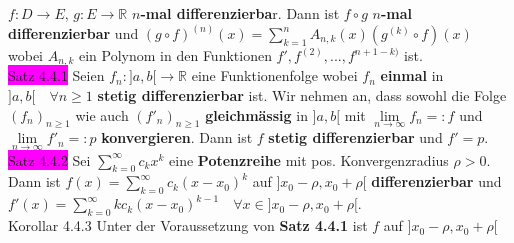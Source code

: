 \documentclass[landscape, 10pt]{article}
\newcommand{\R}{\mathbb{R}}
\begin{document}
\begin{multicols}{3}
                     \textcolor{NavyBlue}{$f:D\longrightarrow E$},
                     \textcolor{NavyBlue}{$g:E\longrightarrow\R$} 
                     \textbf{$n$-mal differenzierba}r.
                     Dann ist \textcolor{NavyBlue}{$f\circ g$} 
                     $n$\textbf{-mal differenzierbar} und 
                     \textcolor{NavyBlue}{
                     $(g\circ f)^{(n)}(x)
                     =\sum_{k=1}^nA_{n,k}(x)(g^{(k)}\circ f)(x)$}
                     wobei \textcolor{NavyBlue}{$A_{n,k}$} 
                     ein Polynom in den Funktionen 
                     \textcolor{NavyBlue}{$f',f^{(2)},...,f^{n+1-k)}$} ist. \\
              \colorbox{magenta}{Satz 4.4.1} 
                     Seien \textcolor{NavyBlue}{$f_n:]a,b[\longrightarrow\R$} 
                     eine Funktionenfolge wobei \textcolor{NavyBlue}{$f_n$} 
                     \textbf{einmal} in 
                     \textcolor{NavyBlue}{$]a,b[\quad\forall n\geqslant1$} 
                     \textbf{stetig differenzierbar} ist.
                     Wir nehmen an, dass sowohl die Folge 
                     \textcolor{NavyBlue}{$(f_n)_{n\geqslant1}$} 
                     wie auch \textcolor{NavyBlue}{$(f'_n)_{n\geqslant1}$} 
                     \textbf{gleichmässig} in \textcolor{NavyBlue}{$]a,b[$} mit 
                     \textcolor{NavyBlue}{$\lim\limits_{n\to\infty}f_n=:f$} 
                     und \textcolor{NavyBlue}{$\lim\limits_{n\to\infty}f'_n=:p$}
                     \textbf{konvergieren}. Dann ist \textcolor{NavyBlue}{$f$}
                     \textbf{stetig differenzierbar} 
                     und \textcolor{NavyBlue}{$f'=p$}. \\
              \colorbox{magenta}{Satz 4.4.2} 
                     Sei \textcolor{NavyBlue}{$\sum_{k=0}^\infty c_kx^k$} 
                     eine \textbf{Potenzreihe} mit 
                     pos. Konvergenzradius \textcolor{NavyBlue}{$\rho>0$}. Dann ist
                     \textcolor{NavyBlue}{$f(x)=\sum_{k=0}^\infty c_k(x-x_0)^k$} 
                     auf \textcolor{NavyBlue}{$]x_0-\rho,x_0+\rho[$} 
                     \textbf{differenzierbar} und 
                     \textcolor{NavyBlue}{
                     $f'(x)=\sum_{k=0}^\infty kc_k(x-x_0)^{k-1}\quad
                     \forall x\in]x_0-\rho,x_0+\rho[$}.\\
              \colorbox{BurntOrange}{Korollar 4.4.3} 
                     Unter der Voraussetzung von \textbf{Satz 4.4.1} ist 
                     \textcolor{NavyBlue}{$f$} auf 
                     \textcolor{NavyBlue}{$]x_0-\rho,x_0+\rho[$} 

\end{multicols}
\end{document}
